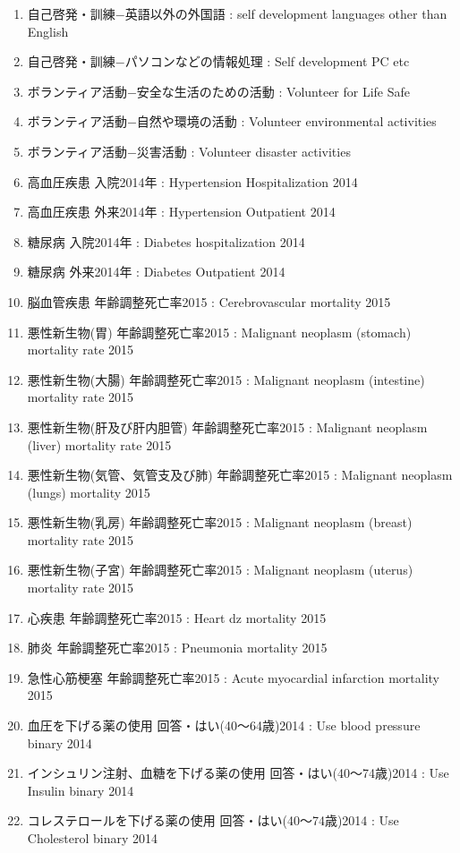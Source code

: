 \begin{enumerate}
  \item 自己啓発・訓練−英語以外の外国語  :  self development languages other than English
  \item 自己啓発・訓練−パソコンなどの情報処理  :  Self development PC etc
  \item ボランティア活動−安全な生活のための活動  :  Volunteer for Life Safe
  \item ボランティア活動−自然や環境の活動  :  Volunteer environmental activities
  \item ボランティア活動−災害活動  :  Volunteer disaster activities
  \item 高血圧疾患 入院2014年  :  Hypertension Hospitalization 2014
  \item 高血圧疾患 外来2014年  :  Hypertension Outpatient 2014
  \item 糖尿病 入院2014年  :  Diabetes hospitalization 2014
  \item 糖尿病 外来2014年  :  Diabetes Outpatient 2014
  \item 脳血管疾患 年齢調整死亡率2015  :  Cerebrovascular mortality 2015
  \item 悪性新生物(胃) 年齢調整死亡率2015  :  Malignant neoplasm (stomach) mortality rate 2015
  \item 悪性新生物(大腸) 年齢調整死亡率2015  :  Malignant neoplasm (intestine) mortality rate 2015
  \item 悪性新生物(肝及び肝内胆管) 年齢調整死亡率2015  :  Malignant neoplasm (liver) mortality rate 2015
  \item 悪性新生物(気管、気管支及び肺) 年齢調整死亡率2015  :  Malignant neoplasm (lungs) mortality 2015
  \item 悪性新生物(乳房) 年齢調整死亡率2015  :  Malignant neoplasm (breast) mortality rate 2015
  \item 悪性新生物(子宮) 年齢調整死亡率2015  :  Malignant neoplasm (uterus) mortality rate 2015
  \item 心疾患 年齢調整死亡率2015  :  Heart dz mortality 2015
  \item 肺炎 年齢調整死亡率2015  :  Pneumonia mortality 2015
  \item 急性心筋梗塞 年齢調整死亡率2015  :  Acute myocardial infarction mortality 2015
  \item 血圧を下げる薬の使用 回答・はい(40〜64歳)2014  :  Use blood pressure binary 2014
  \item インシュリン注射、血糖を下げる薬の使用 回答・はい(40〜74歳)2014  :  Use Insulin binary 2014
  \item コレステロールを下げる薬の使用 回答・はい(40〜74歳)2014  :  Use Cholesterol binary 2014

\end{enumerate}
